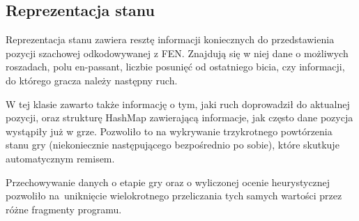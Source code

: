 \subsection{Reprezentacja stanu}
\label{subsec:reprezentacja-stanu}

Reprezentacja stanu zawiera resztę informacji koniecznych do przedstawienia pozycji szachowej odkodowywanej z FEN.
Znajdują się w niej dane o możliwych roszadach, polu en-passant, liczbie posunięć od ostatniego bicia, czy informacji, do którego gracza należy następny ruch.

W tej klasie zawarto także informację o tym, jaki ruch doprowadził do aktualnej pozycji, oraz strukturę HashMap zawierającą informacje, jak często dane pozycja wystąpiły już w grze.
Pozwoliło to na wykrywanie trzykrotnego powtórzenia stanu gry (niekoniecznie następującego bezpośrednio po sobie), które skutkuje automatycznym remisem.

Przechowywanie danych o etapie gry oraz o wyliczonej ocenie heurystycznej pozwoliło na~uniknięcie wielokrotnego przeliczania tych samych wartości przez różne fragmenty programu.

